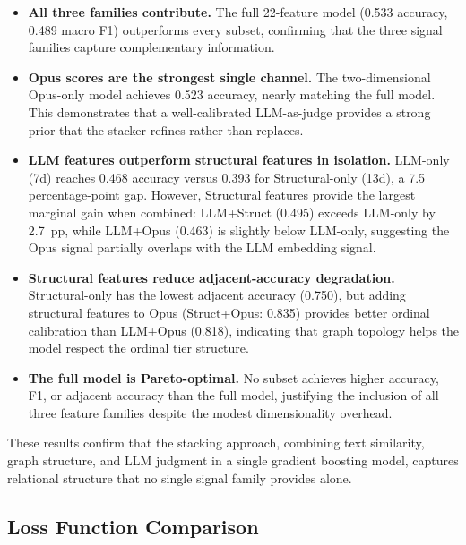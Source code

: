 \begin{itemize}
    \item \textbf{All three families contribute.} The full 22-feature
          model (0.533 accuracy, 0.489 macro F1) outperforms every
          subset, confirming that the three signal families capture
          complementary information.

    \item \textbf{Opus scores are the strongest single channel.} The
          two-dimensional Opus-only model achieves 0.523 accuracy,
          nearly matching the full model. This demonstrates that a
          well-calibrated LLM-as-judge provides a strong prior that the
          stacker refines rather than replaces.

    \item \textbf{LLM features outperform structural features in
          isolation.} LLM-only (7d) reaches 0.468 accuracy versus 0.393
          for Structural-only (13d), a 7.5 percentage-point gap. However,
          Structural features provide the largest marginal gain when
          combined: LLM+Struct (0.495) exceeds LLM-only by 2.7~pp,
          while LLM+Opus (0.463) is slightly below LLM-only, suggesting
          the Opus signal partially overlaps with the LLM embedding
          signal.

    \item \textbf{Structural features reduce adjacent-accuracy
          degradation.} Structural-only has the lowest adjacent accuracy
          (0.750), but adding structural features to Opus (Struct+Opus:
          0.835) provides better ordinal calibration than LLM+Opus
          (0.818), indicating that graph topology helps the model
          respect the ordinal tier structure.

    \item \textbf{The full model is Pareto-optimal.} No subset achieves
          higher accuracy, F1, or adjacent accuracy than the full model,
          justifying the inclusion of all three feature families despite
          the modest dimensionality overhead.
\end{itemize}

These results confirm that the stacking approach, combining text
similarity, graph structure, and LLM judgment in a single gradient
boosting model, captures relational structure that no single signal
family provides alone.

\subsection{Loss Function Comparison}

